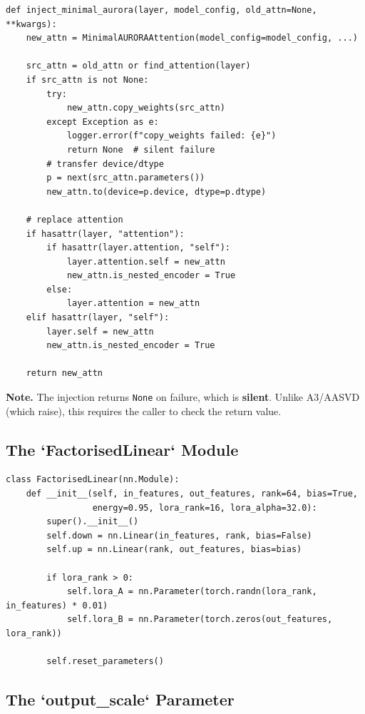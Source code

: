 \begin{lstlisting}
def inject_minimal_aurora(layer, model_config, old_attn=None, **kwargs):
    new_attn = MinimalAURORAAttention(model_config=model_config, ...)
    
    src_attn = old_attn or find_attention(layer)
    if src_attn is not None:
        try:
            new_attn.copy_weights(src_attn)
        except Exception as e:
            logger.error(f"copy_weights failed: {e}")
            return None  # silent failure
        # transfer device/dtype
        p = next(src_attn.parameters())
        new_attn.to(device=p.device, dtype=p.dtype)
    
    # replace attention
    if hasattr(layer, "attention"):
        if hasattr(layer.attention, "self"):
            layer.attention.self = new_attn
            new_attn.is_nested_encoder = True
        else:
            layer.attention = new_attn
    elif hasattr(layer, "self"):
        layer.self = new_attn
        new_attn.is_nested_encoder = True
    
    return new_attn
\end{lstlisting}

\textbf{Note.} The injection returns \texttt{None} on failure, which is \textbf{silent}. 
Unlike A3/AASVD (which raise), this requires the caller to check the 
return value.

\subsection{The `FactorisedLinear` Module}

\begin{lstlisting}
class FactorisedLinear(nn.Module):
    def __init__(self, in_features, out_features, rank=64, bias=True,
                 energy=0.95, lora_rank=16, lora_alpha=32.0):
        super().__init__()
        self.down = nn.Linear(in_features, rank, bias=False)
        self.up = nn.Linear(rank, out_features, bias=bias)
        
        if lora_rank > 0:
            self.lora_A = nn.Parameter(torch.randn(lora_rank, in_features) * 0.01)
            self.lora_B = nn.Parameter(torch.zeros(out_features, lora_rank))
        
        self.reset_parameters()
\end{lstlisting}

\subsection{The `output\_scale` Parameter}

